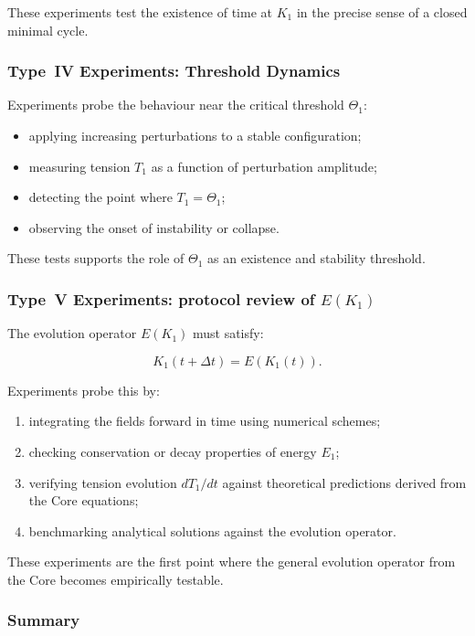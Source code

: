 These experiments test the existence of time at $K_1$ in the precise
sense of a closed minimal cycle.


\subsubsection{Type~IV Experiments: Threshold Dynamics}

Experiments probe the behaviour near the critical threshold $\Theta_1$:

\begin{itemize}
    \item applying increasing perturbations to a stable configuration;
    \item measuring tension $T_1$ as a function of perturbation amplitude;
    \item detecting the point where $T_1 = \Theta_1$;
    \item observing the onset of instability or collapse.
\end{itemize}

These tests supports the role of $\Theta_1$ as an existence and stability
threshold.


\subsubsection{Type~V Experiments: protocol review of \texorpdfstring{$E(K_1)$}{E(K_1)}}

The evolution operator $E(K_1)$ must satisfy:

\[
    K_1(t+\Delta t) = E(K_1(t)).
\]

Experiments probe this by:

\begin{enumerate}
    \item integrating the fields forward in time using numerical schemes;
    \item checking conservation or decay properties of energy $E_1$;
    \item verifying tension evolution $dT_1/dt$ against theoretical
          predictions derived from the Core equations;
    \item benchmarking analytical solutions against the evolution operator.
\end{enumerate}

These experiments are the first point where the general evolution operator
from the Core becomes empirically testable.


\subsubsection{Summary}

